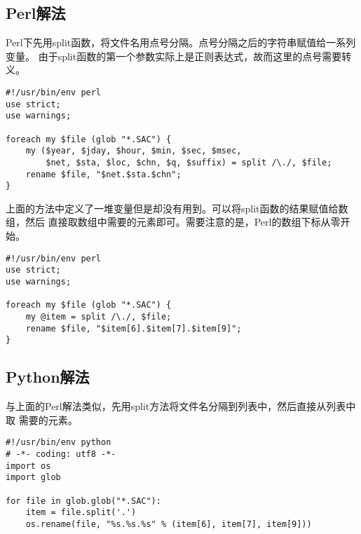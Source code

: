 \subsection{Perl解法}
Perl下先用split函数，将文件名用点号分隔。点号分隔之后的字符串赋值给一系列变量。
由于split函数的第一个参数实际上是正则表达式，故而这里的点号需要转义。
\begin{verbatim}
#!/usr/bin/env perl
use strict;
use warnings;

foreach my $file (glob "*.SAC") {
    my ($year, $jday, $hour, $min, $sec, $msec,
        $net, $sta, $loc, $chn, $q, $suffix) = split /\./, $file;
    rename $file, "$net.$sta.$chn";
}
\end{verbatim}

上面的方法中定义了一堆变量但是却没有用到。可以将split函数的结果赋值给数组，然后
直接取数组中需要的元素即可。需要注意的是，Perl的数组下标从零开始。
\begin{verbatim}
#!/usr/bin/env perl
use strict;
use warnings;

foreach my $file (glob "*.SAC") {
    my @item = split /\./, $file;
    rename $file, "$item[6].$item[7].$item[9]";
}
\end{verbatim}

\subsection{Python解法}
与上面的Perl解法类似，先用split方法将文件名分隔到列表中，然后直接从列表中取
需要的元素。
\begin{verbatim}
#!/usr/bin/env python
# -*- coding: utf8 -*-
import os
import glob

for file in glob.glob("*.SAC"):
    item = file.split('.')
    os.rename(file, "%s.%s.%s" % (item[6], item[7], item[9]))
\end{verbatim}
